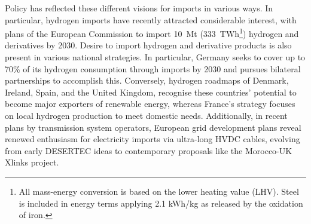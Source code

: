 
Policy has reflected these different visions for imports in various ways. In
particular, hydrogen imports have recently attracted considerable interest, with
plans of the European Commission\cite{europeancommissionRepowerEUPlan} to import
10~Mt (333~TWh\footnote{All mass-energy conversion is based on the lower heating
value (LHV). Steel is included in energy terms applying 2.1 kWh/kg as released
by the oxidation of iron.}) hydrogen and derivatives by 2030. Desire to import
hydrogen and derivative products is also present in various national
strategies.\cite{corbeauNationalHydrogenStrategies2024} In particular, Germany
seeks to cover up to 70\% of its hydrogen consumption through imports by 2030
and pursues bilateral partnerships to accomplish
this.\cite{bundesministeriumfuerwirtschaftundklimaschutzFortschreibungNationalenWasserstoffstrategie2023}
Conversely, hydrogen roadmaps of
Denmark,\cite{danishministryofclimateenergyandutilitiesRegeringensStrategiPowertoX2021}
Ireland,\cite{departmentoftheenvironmentclimateandcommunicationsgovernmentofirelandNationalHydrogenStrategy2023}
Spain,\cite{marcoestrategicodeenergiayclimaRutaHidrogenoApuesta2020} and the
United
Kingdom,\cite{ukdepartmentforenergysecurity&netzeroHydrogenStrategyUpdate2023}
recognise these countries' potential to become major exporters of renewable
energy, whereas France's strategy focuses on local hydrogen production to meet
domestic needs.\cite{frenchgovernmentStrategieNationalePour2023} Additionally,
in recent plans by transmission system
operators,\cite{entso-eTYNDP2024Project2024}  European grid development plans
reveal renewed enthusiasm for electricity imports via ultra-long HVDC cables,
evolving from early
DESERTEC\cite{desertecfoundationDESERTECSustainableWealth2024} ideas to
contemporary proposals like the Morocco-UK Xlinks
project.\cite{xlinksMoroccoUKPower2023}


